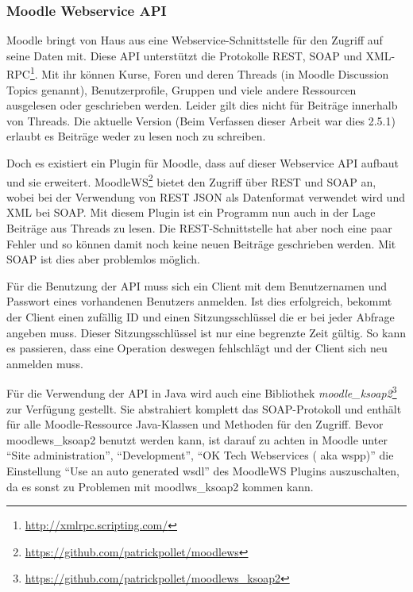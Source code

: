 \subsubsection{Moodle Webservice API} %
\label{ssub:moodle_webservice}

Moodle bringt von Haus aus eine Webservice-Schnittstelle für den Zugriff auf seine Daten mit. Diese API unterstützt die Protokolle REST, SOAP und XML-RPC\footnote{\url{http://xmlrpc.scripting.com/}}. Mit ihr können Kurse, Foren und deren Threads (in Moodle Discussion Topics genannt), Benutzerprofile, Gruppen und viele andere Ressourcen ausgelesen oder geschrieben werden. Leider gilt dies nicht für Beiträge innerhalb von Threads. Die aktuelle Version (Beim Verfassen dieser Arbeit war dies 2.5.1) erlaubt es Beiträge weder zu lesen noch zu schreiben.

Doch es existiert ein Plugin für Moodle, dass auf dieser Webservice API aufbaut und sie erweitert. MoodleWS\footnote{\url{https://github.com/patrickpollet/moodlews}} bietet den Zugriff über REST und SOAP an, wobei bei der Verwendung von REST JSON als Datenformat verwendet wird und XML bei SOAP. Mit diesem Plugin ist ein Programm nun auch in der Lage Beiträge aus Threads zu lesen. Die REST-Schnittstelle hat aber noch eine paar Fehler und so können damit noch keine neuen Beiträge geschrieben werden. Mit SOAP ist dies aber problemlos möglich.

Für die Benutzung der API muss sich ein Client mit dem Benutzernamen und Passwort eines vorhandenen Benutzers anmelden. Ist dies erfolgreich, bekommt der Client einen zufällig ID und einen Sitzungsschlüssel die er bei jeder Abfrage angeben muss. Dieser Sitzungsschlüssel ist nur eine begrenzte Zeit gültig. So kann es passieren, dass eine Operation deswegen fehlschlägt und der Client sich neu anmelden muss.

Für die Verwendung der API in Java wird auch eine Bibliothek \emph{moodle\_ksoap2}\footnote{\url{https://github.com/patrickpollet/moodlews\_ksoap2}} zur Verfügung gestellt. Sie abstrahiert komplett das SOAP-Protokoll und enthält für alle Moodle-Ressource Java-Klassen und Methoden für den Zugriff. Bevor moodlews\_ksoap2 benutzt werden kann, ist darauf zu achten in Moodle unter \enquote{Site administration}, \enquote{Development}, \enquote {OK Tech Webservices ( aka wspp)} die Einstellung \enquote{Use an auto generated wsdl} des MoodleWS Plugins auszuschalten, da es sonst zu Problemen mit moodlws\_ksoap2 kommen kann.

